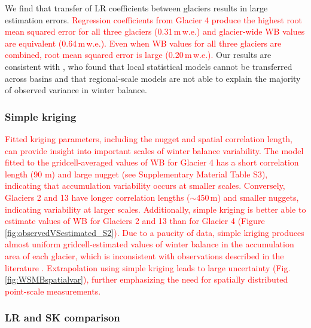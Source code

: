 \documentclass[twocolumn, letterpaper]{igs}
\begin{document}
We find that transfer of LR coefficients between glaciers results in large estimation errors. \textcolor{red}{Regression coefficients from Glacier 4 produce the highest root mean squared error for all three glaciers (0.31\,m\,w.e.) and glacier-wide WB values are equivalent (0.64\,m\,w.e.). Even when WB values for all three glaciers are combined, root mean squared error is large (0.20\,m\,w.e.). }Our results are consistent with \cite{Grunewald2013}, who found that local statistical models cannot be transferred across basins and that regional-scale models are not able to explain the majority of observed variance in winter balance. 

\subsubsection{Simple kriging}

\textcolor{red}{Fitted kriging parameters, including the nugget and spatial correlation length, can provide insight into important scales of winter balance variability. The model fitted to the gridcell-averaged values of WB for Glacier 4 has a short correlation length (90 m) and large nugget (see Supplementary Material Table S3), indicating that accumulation variability occurs at smaller scales. Conversely, Glaciers 2 and 13 have longer correlation lengths ($\sim$450\,m) and smaller nuggets, indicating variability at larger scales. Additionally, simple kriging is better able to estimate values of WB for Glaciers 2 and 13 than for Glacier 4 (Figure \ref{fig:observedVSestimated_S2}). Due to a paucity of data, simple kriging produces almost uniform gridcell-estimated values of winter balance in the accumulation area of each glacier, which is inconsistent with observations described in the literature \citep[e.g.][]{Machguth2006, Grabiec2011}. Extrapolation using simple kriging leads to large uncertainty (Fig. \ref{fig:WSMBspatialvar}), further emphasizing the need for spatially distributed point-scale measurements. }

\subsubsection{LR and SK comparison}
 
\end{document}
